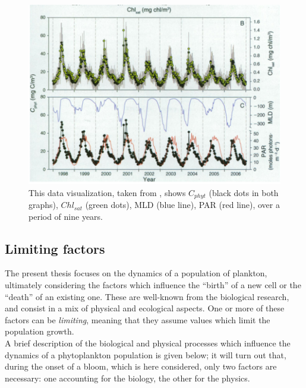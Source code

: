 \begin{figure} [H]
    \includegraphics[width=\textwidth]{img/references/behrenfeld2010alldata}
    \caption{This data visualization, taken from \autocite{Behrenfeld2010AbandoningBlooms}, shows $C_{phyt}$ (black dots in both graphs), $Chl_{sat}$ (green dots), MLD (blue line), PAR (red line), over a period of nine years.}
    \label{fig:behrenfeld2010alldata}
\end{figure}

\subsection{Limiting factors}
The present thesis focuses on the dynamics of a population of plankton, ultimately considering the factors which influence the ``birth'' of a new cell or the ``death'' of an existing one. These are well-known from the biological research, and consist in a mix of physical and ecological aspects. One or more of these factors can be \textit{limiting}, meaning that they assume values which limit the population growth. \\
A brief description of the biological and physical processes which influence the dynamics of a phytoplankton population is given below; it will turn out that, during the onset of a bloom, which is here considered, only two factors are necessary: one accounting for the biology, the other for the physics.

